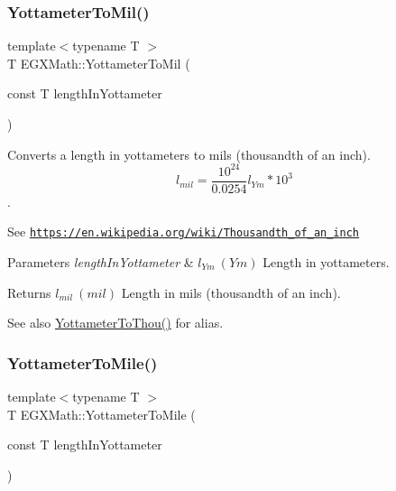 \subsubsection{\texorpdfstring{Yottameter\+To\+Mil()}{YottameterToMil()}}
{\footnotesize\ttfamily template$<$typename T $>$ \\
T E\+G\+X\+Math\+::\+Yottameter\+To\+Mil (\begin{DoxyParamCaption}\item[{const T}]{length\+In\+Yottameter }\end{DoxyParamCaption})}



Converts a length in yottameters to mils (thousandth of an inch). \[ l_{mil}= \frac{10^{24}}{0.0254} l_{Ym} * 10^{3} \]. 

See \href{https://en.wikipedia.org/wiki/Thousandth_of_an_inch}{\tt https\+://en.\+wikipedia.\+org/wiki/\+Thousandth\+\_\+of\+\_\+an\+\_\+inch} 
\begin{DoxyParams}{Parameters}
{\em length\+In\+Yottameter} & $ l_{Ym}\ (Ym)$ Length in yottameters. \\
\hline
\end{DoxyParams}
\begin{DoxyReturn}{Returns}
$ l_{mil}\ (mil)$ Length in mils (thousandth of an inch). 
\end{DoxyReturn}
\begin{DoxySeeAlso}{See also}
\mbox{\hyperlink{group___e_g_x_math-_conversions-_length_conversions-_s_i-_yottameter-_imperial_ga9bf8eeca799b8246932d4aeaac425d87}{Yottameter\+To\+Thou()}} for alias. 
\end{DoxySeeAlso}
\mbox{\label{group___e_g_x_math-_conversions-_length_conversions-_s_i-_yottameter-_imperial_ga4ca41b9b222f31926417df30e0539b50}} 
\subsubsection{\texorpdfstring{Yottameter\+To\+Mile()}{YottameterToMile()}}
{\footnotesize\ttfamily template$<$typename T $>$ \\
T E\+G\+X\+Math\+::\+Yottameter\+To\+Mile (\begin{DoxyParamCaption}\item[{const T}]{length\+In\+Yottameter }\end{DoxyParamCaption})}



